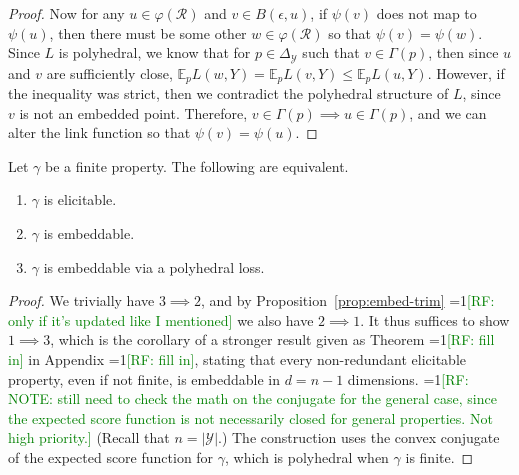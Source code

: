 \documentclass[anon,12pt]{colt2019}
\newcommand{\Comments}{1}
\newcommand{\mynote}[2]{\ifnum\Comments=1\textcolor{#1}{#2}\fi}
\newcommand{\raf}[1]{\mynote{green}{[RF: #1]}}
\newcommand{\simplex}{\Delta_\Y}
\newcommand{\E}{\mathbb{E}}
\newcommand{\R}{\mathcal{R}}
\newcommand{\Y}{\mathcal{Y}}
\newcommand{\conv}{\mathrm{conv}}
\DeclareMathOperator*{\arginf}{arg\,inf}
\begin{document}
\begin{proof}
  Now for any $u \in \varphi(\R)$ and $v \in B(\epsilon, u)$, if $\psi(v)$ does not map to $\psi(u)$, then there must be some other $w \in \varphi(\R)$ so that $\psi(v) = \psi(w)$.
  Since $L$ is polyhedral, we know that for $p \in \simplex$ such that $v \in \Gamma(p)$, then since $u$ and $v$ are sufficiently close, $\E_p L(w,Y) = \E_p L(v,Y) \leq \E_p L(u,Y)$.
  However, if the inequality was strict, then we contradict the polyhedral structure of $L$, since $v$ is not an embedded point.
  Therefore, $v \in \Gamma(p) \implies u \in \Gamma(p)$, and we can alter the link function so that $\psi(v) = \psi(u)$.
\end{proof}

\begin{theorem}
  Let $\gamma$ be a finite property.
  The following are equivalent.
  \begin{enumerate}
  \item $\gamma$ is elicitable.
  \item $\gamma$ is embeddable.
  \item $\gamma$ is embeddable via a polyhedral loss.
  \end{enumerate}
\end{theorem}
\begin{proof}
  We trivially have $3\implies 2$, and by Proposition~\ref{prop:embed-trim} \raf{only if it's updated like I mentioned} we also have $2\implies 1$.
  It thus suffices to show $1\implies 3$, which is the corollary of a stronger result given as Theorem \raf{fill in} in Appendix \raf{fill in}, stating that every non-redundant elicitable property, even if not finite, is embeddable in $d =n-1$ dimensions.
  \raf{NOTE: still need to check the math on the conjugate for the general case, since the expected score function is not necessarily closed for general properties.  Not high priority.}
  (Recall that $n = |\Y|$.)
  The construction uses the convex conjugate of the expected score function for $\gamma$, which is polyhedral when $\gamma$ is finite.
\end{proof}
\end{document}
